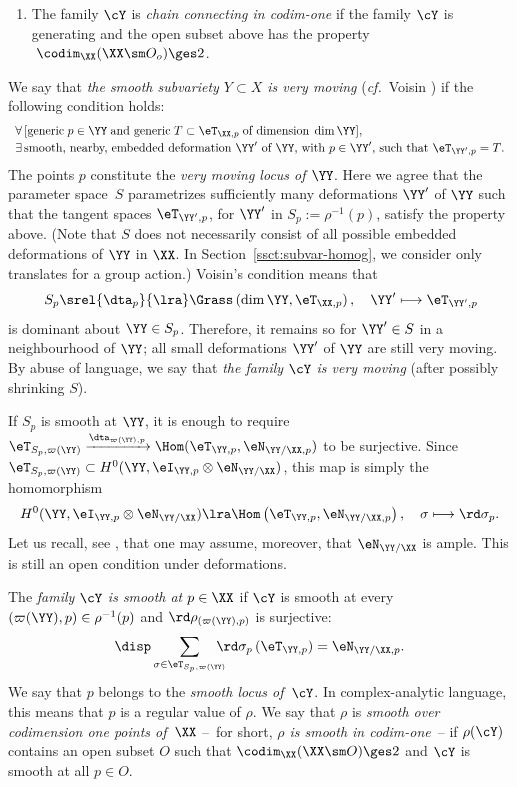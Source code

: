 \begin{m-definition}
\begin{aenum}
\begin{enumerate}
\item\label{d:YY-g-b4} The family $\cY$ is \emph{chain connecting in codim-one} if the family $\cY$ is generating and the open subset above has the property $\;\codim_\XX(\XX\sm O_o)\ges2$.
\end{enumerate}

\item \label{d:YY-g-c}
We say that \emph{the smooth subvariety $Y\subset X$ is very moving} (\textit{cf.}~Voisin \cite[Definition 0.5]{voisin-coniv}) if the following condition holds:
\[
\begin{array}{l}
\forall\,[\text{generic}\;p\in\YY\;\text{and generic}\;T\subset\eT_{\XX,p}\;\text{of dimension}\;\dim\YY],\\[.5ex] 
\exists\,\text{smooth, nearby, embedded deformation $\YY'$ of $\YY$, with $p\in\YY'$, such that $\eT_{\YY',p}=T$.}
\end{array}
\]
The points $p$ constitute the \emph{very moving locus of $\YY$}.  Here we agree that the parameter space~$S$ parametrizes sufficiently many deformations $\YY'$ of $\YY$ such that the tangent spaces $\eT_{\YY', p}$, for $\YY'$ in $S_p:=\rho^{-1}(p)$, satisfy the property above. (Note that $S$ does not necessarily consist of all possible embedded deformations of $\YY$ in $\XX$. In Section~\ref{ssct:subvar-homog}, we consider only translates for a group action.) 
Voisin's condition means that 
\[
\,S_p\srel{\dta_p}{\lra} \Grass\left(\dim\YY,\eT_{\XX,p}\right),\quad \YY'\longmapsto \eT_{\YY',p} 
\]
is dominant about $\YY\in S_p$. Therefore, it remains so for $\YY'\in S$ in a neighbourhood of $\YY$; all small deformations $\YY'$ of $\YY$ are still very moving. By abuse of language, we say that \emph{the family $\cY$ is very moving} (after possibly shrinking $S$).

If $S_p$ is smooth at $\YY$, it is enough to require  $\eT_{S_p,\varpi(\YY)}\xrightarrow{\dta_{\varpi(\YY),p}}\Hom(\eT_{\YY,p},\eN_{\YY/\XX,p})$ to be surjective. Since $\eT_{S_p,\varpi(\YY)}\subset H^0(\YY,\eI_{\YY,p}\otimes\eN_{\YY/\XX})$, this map is simply the homomorphism
\[
H^0(\YY,\eI_{\YY,p}\otimes\eN_{\YY/\XX})\lra \Hom\left(\eT_{\YY,p},\eN_{\YY/\XX,p}\right),\quad \sigma\longmapsto\rd\sigma_p.
\]
Let us recall, see \cite[Remark 2.6]{voisin-coniv}, that one may assume, moreover, that $\eN_{\YY/\XX}$ is ample. This is still an open condition under deformations.

\item\label{d:YY-g-d}
The \emph{family $\cY$ is smooth at $p\in\XX$} if $\cY$ is smooth at every $(\varpi(\YY),p)\in\rho^{-1}(p)$ and $\rd\rho_{(\varpi(\YY),p)}$ is surjective: 
\[
\disp\sum_{\sigma\in\eT_{S_p,\varpi(\YY)}}\kern-2ex\rd\sigma_p\left(\eT_{\YY,p}\right)=\eN_{\YY/\XX,p}.
\]
We say that $p$ belongs to the \emph{smooth locus of\, $\cY$}. In complex-analytic language, this means that $p$ is a regular value of $\rho$. We say that $\rho$ is {\em smooth over codimension one points of\, $\XX$} --~for short, \emph{$\rho$ is smooth in codim-one}~-- if $\rho(\cY)$ contains an open subset $O$ such that $\codim_\XX(\XX\sm O)\ges2$ and $\cY$ is smooth at all $p\in O$. 


\end{aenum}
\end{m-definition}
